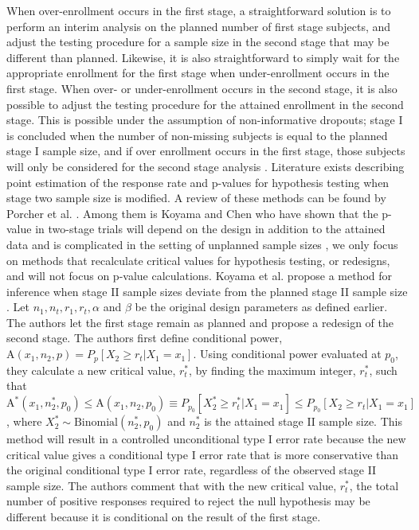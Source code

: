 \documentclass[12pt]{report}\usepackage[]{graphicx}\usepackage[]{color}
\newlength{\li}\setlength{\li}{14.48pt}
\newlength{\di}\setlength{\di}{-3.5mm}
\begin{document}
When over-enrollment occurs in the first stage, a straightforward solution is to perform an interim analysis on the planned number of first stage subjects, and adjust the testing procedure for a sample size in the second stage that may be different than planned. Likewise, it is also straightforward to simply wait for the appropriate enrollment for the first stage when under-enrollment occurs in the first stage. When over- or under-enrollment occurs in the second stage, it is also possible to adjust the testing procedure for the attained enrollment in the second stage.  This is possible under the assumption of non-informative dropouts; stage I is concluded when the number of non-missing subjects is equal to the planned stage I sample size, and if over enrollment occurs in the first stage, those subjects will only be considered for the second stage analysis \cite{Koyama}. Literature exists describing point estimation of the response rate and p-values for hypothesis testing when stage two sample size is modified. A review of these methods can be found by Porcher et al. \cite{Porcher}. Among them is Koyama and Chen who have shown that the p-value in two-stage trials will depend on the design in addition to the attained data and is complicated in the setting of unplanned sample sizes \cite{Koyama}, we only focus on methods that recalculate critical values for hypothesis testing, or redesigns, and will not focus on p-value calculations. Koyama et al. propose a method for inference when stage II sample sizes deviate from the planned stage II sample size \cite{Koyama}. Let $n_1, n_t, r_1, r_t, \alpha$ and $\beta$ be the original design parameters as defined earlier. The authors let the first stage remain as planned and propose a redesign of the second stage. The authors first define conditional power, $\mbox{A}(x_1, n_2, p) = P_p[X_2 \geq r_t | X_1 = x_1].$ Using conditional power evaluated at $p_0$, they calculate a new critical value, $r_t^\ast$, by finding the maximum integer, $r_t^\ast$, such that $\mbox{A}^\ast(x_1, n_2^\ast, p_0) \leq \mbox{A}(x_1, n_2, p_0) \equiv P_{p_0}[X_2^\ast \geq r_t^\ast | X_1 = x_1] \leq P_{p_0}[X_2 \geq r_t | X_1 = x_1]$, where $X_2^\ast \sim \mbox{Binomial}(n_2^\ast, p_0)$ and $n_2^\ast$ is the attained stage II sample size. This method will result in a controlled unconditional type I error rate because the new critical value gives a conditional type I error rate that is more conservative than the original conditional type I error rate, regardless of the observed stage II sample size. The authors comment that with the new critical value, $r_t^\ast$, the total number of positive responses required to reject the null hypothesis may be different because it is conditional on the result of the first stage. \\
\end{document}
